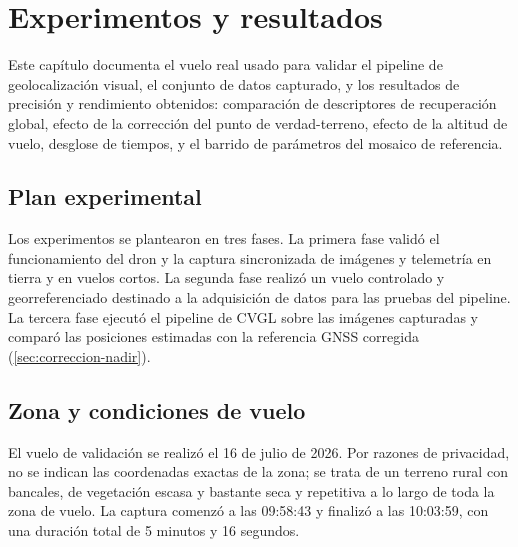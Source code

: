 
\chapter{Experimentos y resultados}
\label{cap:experimentos-resultados}

\begin{Resumen}
Este capítulo documenta el vuelo real usado para validar el pipeline de geolocalización visual, el conjunto de datos capturado, y los resultados de precisión y rendimiento obtenidos: comparación de descriptores de recuperación global, efecto de la corrección del punto de verdad-terreno, efecto de la altitud de vuelo, desglose de tiempos, y el barrido de parámetros del mosaico de referencia.
\end{Resumen}

\section{Plan experimental}
\label{sec:plan-experimental}

Los experimentos se plantearon en tres fases. La primera fase validó el funcionamiento del dron y la captura sincronizada de imágenes y telemetría en tierra y en vuelos cortos. La segunda fase realizó un vuelo controlado y georreferenciado destinado a la adquisición de datos para las pruebas del pipeline. La tercera fase ejecutó el pipeline de CVGL sobre las imágenes capturadas y comparó las posiciones estimadas con la referencia GNSS corregida (\autoref{sec:correccion-nadir}).

\section{Zona y condiciones de vuelo}
\label{sec:zona-condiciones-vuelo}

El vuelo de validación se realizó el 16 de julio de 2026. Por razones de privacidad, no se indican las coordenadas exactas de la zona; se trata de un terreno rural con bancales, de vegetación escasa y bastante seca y repetitiva a lo largo de toda la zona de vuelo. La captura comenzó a las 09:58:43 y finalizó a las 10:03:59, con una duración total de 5 minutos y 16 segundos.

